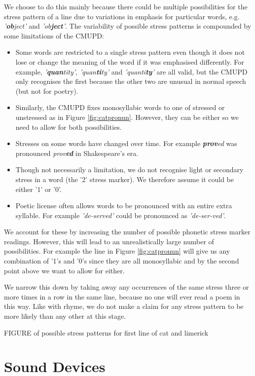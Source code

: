 We choose to do this mainly because there could be multiple possibilities for the stress pattern of a line due to variations in emphasis for particular words, e.g. \textit{'\textbf{ob}ject'} and \textit{'ob\textbf{ject}'}. The variability of possible stress patterns is compounded by some limitations of the CMUPD:
\begin{itemize}
\item{Some words are restricted to a single stress pattern even though it does not lose or change the meaning of the word if it was emphasised differently. For example, \textit{'\textbf{quan}tity'}, \textit{'quan\textbf{ti}ty'} and \textit{'quanti\textbf{ty}'} are all valid, but the CMUPD only recognises the first because the other two are unusual in normal speech (but not for poetry).}
\item{Similarly, the CMUPD fixes monosyllabic words to one of stressed or unstressed as in Figure \ref{fig:catpronun}. However, they can be either so we need to allow for both possibilities.}
\item{Stresses on some words have changed over time. For example \textit{\textbf{prov}ed} was pronounced \textit{prov\textbf{ed}} in Shakespeare's era.}
\item{Though not necessarily a limitation, we do not recognise light or secondary stress in a word (the '2' stress marker). We therefore assume it could be either '1' or '0'.}
\item{Poetic license often allows words to be pronounced with an entire extra syllable. For example \textit{'de-served'} could be pronounced as \textit{'de-ser-ved'}.}
\end{itemize}

We account for these by increasing the number of possible phonetic stress marker readings. However, this will lead to an unrealistically large number of possibilities. For example the line in Figure \ref{fig:catpronun} will give us any combination of '1's and '0's since they are all monosyllabic and by the second point above we want to allow for either. 

We narrow this down by taking away any occurrences of the same stress three or more times in a row in the same line, because no one will ever read a poem in this way.  Like with rhyme, we do not make a claim for any stress pattern to be more likely than any other at this stage.

FIGURE of possible stress patterns for first line of cat and limerick


\section{Sound Devices}

